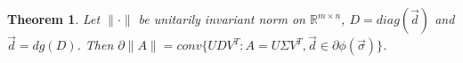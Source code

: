 \documentclass[11pt]{article}
\def\BR{{\mathbb R}}
\newtheorem{theorem}{Theorem}[section]
\begin{document}
\begin{theorem}
 Let $\|\cdot\|$ be unitarily invariant norm on $\BR^{m \times n}$, $D = diag(\vec{d})$ and $\vec{d} = dg(D)$.
 Then $\partial \|A\| = conv\{ UDV^T : A = U\Sigma V^T, \vec{d} \in \partial \phi(\vec{\sigma}) \}$. 
\end{theorem}

%   
% 
%   
%   
%   
% 
\end{document}

